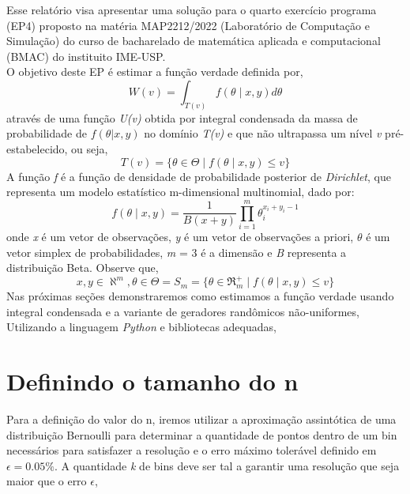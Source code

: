 \documentclass{article}
\begin{document}
Esse relatório visa apresentar uma solução para o quarto exercício programa (EP4) proposto na matéria MAP2212/2022 (Laboratório de Computação e Simulação) do curso de bacharelado de matemática aplicada e computacional (BMAC) do instituito IME-USP.\\
O objetivo deste EP é estimar a função verdade definida por,
\begin{equation}
    W(v)= \int_{T(v)} f(\theta\mid x,y)d\theta 
\end{equation}
através de uma função \textit{U(v)} obtida por integral condensada da massa de probabilidade\cite{kaplan1987improved} de $f(\theta|x,y)$ no domínio \textit {T(v)} e que não ultrapassa um nível \textit{v} pré-estabelecido, ou seja,
\begin{equation}
    T(v)=\{ \theta  \in   \Theta  \mid f(\theta\mid x,y)\leq v\}
\end{equation}
A função \textit{f} é a função de densidade de probabilidade posterior de \textit{Dirichlet}, que representa um modelo estatístico m-dimensional multinomial, dado por:
\begin{equation}
    f(\theta\mid x,y) =  \frac{1}{B(x+y)}  \prod_{i=1}^m  \theta_i^{x_i+y_i-1} 
\end{equation}
onde \textit{x} é um vetor de observações, \textit{y} é um vetor de observações a priori, $\theta$ é um vetor simplex de probabilidades, \textit{m} = 3 é a dimensão e \textit{B} representa a distribuição Beta. Observe que, 
\begin{equation}
    x,y \in   \aleph ^m,  \theta  \in  \Theta =S_m=\{ \theta  \in  \Re _m^+ \mid f(\theta\mid x,y)\leq v\}
\end{equation}
Nas próximas seções demonstraremos como estimamos a função verdade usando integral condensada e a variante de geradores randômicos não-uniformes,
Utilizando a linguagem \textit{Python} e bibliotecas adequadas\cite{harris2020array, Waskom2021, Hunter:2007, 2020SciPy-NMeth}, 

\section{Definindo o tamanho do n}

Para a definição do valor do n, iremos utilizar a aproximação assintótica de uma distribuição Bernoulli para determinar a quantidade de pontos dentro de um bin necessários para satisfazer a resolução e o erro máximo tolerável definido em $\epsilon = 0.05\% $. A quantidade \textit{k} de bins deve ser tal a garantir uma resolução que seja maior que o erro $\epsilon$,
\end{document}
